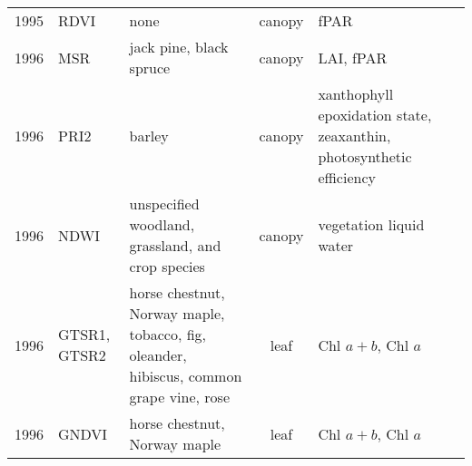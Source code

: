 \documentclass[10pt]{article}
\begin{document}
{\begin{ThreePartTable}
\begin{longtable}{c M{1.5in} M{2.5in} c M{1.5in} M{1.5in}}
  1995 & RDVI                                            & none                                                                                                                                                                                                                                                  & canopy       & fPAR                                                                                     & \citet{Roujean1995}                                 \\
  1996 & MSR                                             & jack pine, black spruce                                                                                                                                                                                                                               & canopy       & LAI, fPAR                                                                                & \citet{Chen1996}                                    \\
  1996 & PRI2                                            & barley                                                                                                                                                                                                                                                & canopy       & xanthophyll epoxidation state, zeaxanthin, photosynthetic efficiency                     & \citet{Filella1996}                                 \\
  1996 & NDWI                                            & unspecified woodland, grassland, and crop species                                                                                                                                                                                                     & canopy       & vegetation liquid water                                                                  & \citet{Gao1996}                                     \\
  1996 & GTSR1, GTSR2                                    & horse chestnut, Norway maple, tobacco, fig, oleander, hibiscus, common grape vine, rose                                                                                                                                                               & leaf         & Chl $a+b$, Chl $a$                                                                       & \citet{Gitelson1996b,Gitelson1997,Lichtenthaler1996}\\
  1996 & GNDVI                                           & horse chestnut, Norway maple                                                                                                                                                                                                                          & leaf         & Chl $a+b$, Chl $a$                                                                       & \citet{Gitelson1996a}                               \\

\end{longtable}
\end{ThreePartTable}}
\end{document}
